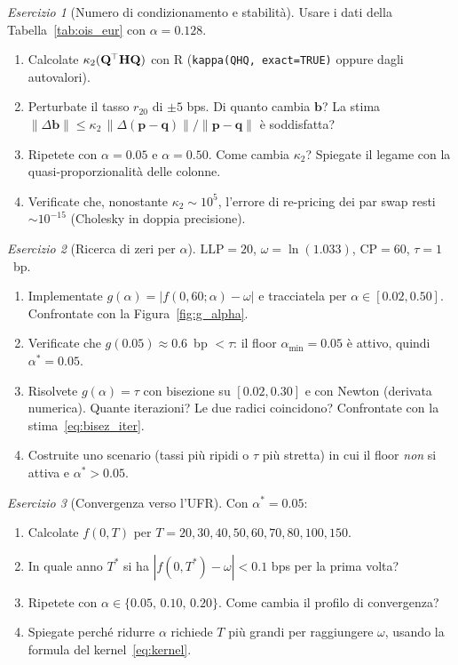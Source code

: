 \documentclass[11pt,a4paper]{article}
\theoremstyle{plain}
\theoremstyle{definition}
\theoremstyle{remark}
\newtheorem{esercizio}{Esercizio}[section]
\newcommand{\LLP}{\mathrm{LLP}}
\newcommand{\CP}{\mathrm{CP}}
\newcommand{\bfb}{\mathbf{b}}
\newcommand{\bfp}{\mathbf{p}}
\newcommand{\bfq}{\mathbf{q}}
\newcommand{\Hmat}{\mathbf{H}}
\newcommand{\Qmat}{\mathbf{Q}}
\newcommand{\transp}{^{\mskip-1mu\top}}
\newcommand{\abs}[1]{\left\lvert #1 \right\rvert}
\begin{document}
\begin{esercizio}[Numero di condizionamento e stabilit\`a]
Usare i dati della Tabella~\ref{tab:ois_eur} con $\alpha=0.128$.
\begin{enumerate}[label=(\alph*)]
  \item Calcolate $\kappa_2(\Qmat\transp\Hmat\Qmat)$ con R
        (\texttt{kappa(QHQ, exact=TRUE)} oppure dagli autovalori).
  \item Perturbate il tasso $r_{20}$ di $\pm 5$ bps. Di quanto cambia $\bfb$?
        La stima $\|\Delta\bfb\| \le \kappa_2\,\|\Delta(\bfp-\bfq)\|/\|\bfp-\bfq\|$
        \`e soddisfatta?
  \item Ripetete con $\alpha=0.05$ e $\alpha=0.50$. Come cambia $\kappa_2$?
        Spiegate il legame con la quasi-proporzionalità delle colonne.
  \item Verificate che, nonostante $\kappa_2\sim 10^5$, l'errore di re-pricing dei
        par swap resti $\sim 10^{-15}$ (Cholesky in doppia precisione).
\end{enumerate}
\end{esercizio}

\begin{esercizio}[Ricerca di zeri per $\alpha$]
$\LLP=20$, $\omega=\ln(1.033)$, $\CP=60$, $\tau=1$~bp.
\begin{enumerate}[label=(\alph*)]
  \item Implementate $g(\alpha) = \abs{f(0,60;\alpha) - \omega}$ e tracciatela
        per $\alpha \in [0.02, 0.50]$. Confrontate con la Figura~\ref{fig:g_alpha}.
  \item Verificate che $g(0.05)\approx 0.6$~bp $<\tau$: il floor $\alpha_{\min}=0.05$
        è attivo, quindi $\alpha^*=0.05$.
  \item Risolvete $g(\alpha)=\tau$ con bisezione su $[0.02,0.30]$ e con Newton
        (derivata numerica). Quante iterazioni? Le due radici coincidono?
        Confrontate con la stima~\eqref{eq:bisez_iter}.
  \item Costruite uno scenario (tassi più ripidi o $\tau$ più stretta) in cui il
        floor \emph{non} si attiva e $\alpha^*>0.05$.
\end{enumerate}
\end{esercizio}

\begin{esercizio}[Convergenza verso l'UFR]
Con $\alpha^*=0.05$:
\begin{enumerate}[label=(\alph*)]
  \item Calcolate $f(0,T)$ per $T=20,30,40,50,60,70,80,100,150$.
  \item In quale anno $T^*$ si ha $|f(0,T^*) - \omega| < 0.1$ bps per la prima volta?
  \item Ripetete con $\alpha \in \{0.05,\,0.10,\,0.20\}$.
        Come cambia il profilo di convergenza?
  \item Spiegate perch\'e ridurre $\alpha$ richiede $T$ pi\`u grandi per
        raggiungere $\omega$, usando la formula del kernel~\eqref{eq:kernel}.
\end{enumerate}
\end{esercizio}
\end{document}
